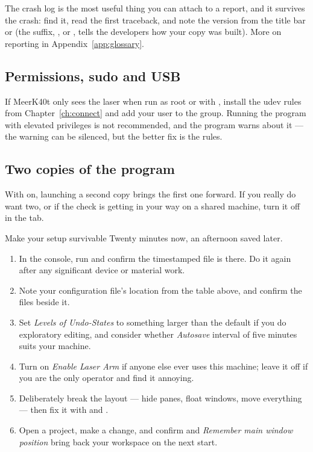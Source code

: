 \noindent The crash log is the most useful thing you can attach to a report, and
it survives the crash: find it, read the first traceback, and note the version
from the title bar or  (the suffix, ,
 or , tells the developers how your copy was built). More on
reporting in Appendix~\ref{app:glossary}.

\subsection*{Permissions, sudo and USB}

If MeerK40t only sees the laser when run as root or with , install the
udev rules from Chapter~\ref{ch:connect} and add your user to the 
group. Running the program with elevated privileges is not recommended, and the
program warns about it --- the warning can be silenced, but the better fix is the
rules.

\subsection*{Two copies of the program}

With  on, launching a second copy brings the first one
forward. If you really do want two, or if the check is getting in your way on a
shared machine, turn it off in the  tab.

\begin{tryit}{Make your setup survivable}
Twenty minutes now, an afternoon saved later.
\begin{enumerate}[label=\arabic*.,leftmargin=1.4em]
  \item In the console, run  and
        confirm the timestamped  file is there. Do it again after any
        significant device or material work.
  \item Note your configuration file's location from the table above, and confirm
        the  files beside it.
  \item Set \emph{Levels of Undo-States} to something larger than the default if
        you do exploratory editing, and consider whether \emph{Autosave} interval
        of five minutes suits your machine.
  \item Turn on \emph{Enable Laser Arm} if anyone else ever uses this machine;
        leave it off if you are the only operator and find it annoying.
  \item Deliberately break the layout --- hide panes, float windows, move
        everything --- then fix it with  and
        .
  \item Open a project, make a change, and confirm 
        and \emph{Remember main window position} bring back your workspace on the
        next start.
\end{enumerate}
\end{tryit}
